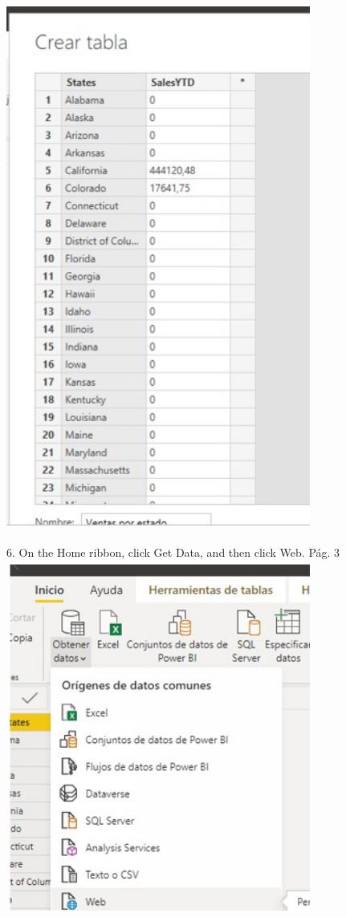 \documentclass[preprint,12pt]{elsarticle}
\begin{document}
\begin{itemize}
		 		\\ \includegraphics[width=10cm]{./IMAGENES/3.5} \\
		 		\\ 6. On the Home ribbon, click Get Data, and then click Web.
		 		Pág. 3
		 		\\ \includegraphics[width=10cm]{./IMAGENES/3.6} \\

\end{itemize}
\end{document}
